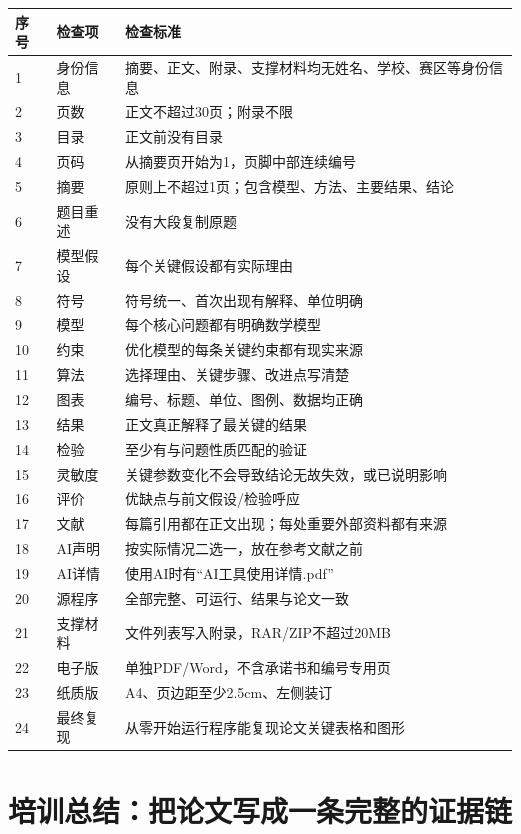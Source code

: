 \documentclass[12pt,a4paper]{article}
\begin{document}
\begin{longtable}{p{1cm}p{2cm}p{12cm}}
\toprule
序号 & 检查项 & 检查标准 \\
\midrule
1 & 身份信息 & 摘要、正文、附录、支撑材料均无姓名、学校、赛区等身份信息 \\
2 & 页数 & 正文不超过30页；附录不限 \\
3 & 目录 & 正文前没有目录 \\
4 & 页码 & 从摘要页开始为1，页脚中部连续编号 \\
5 & 摘要 & 原则上不超过1页；包含模型、方法、主要结果、结论 \\
6 & 题目重述 & 没有大段复制原题 \\
7 & 模型假设 & 每个关键假设都有实际理由 \\
8 & 符号 & 符号统一、首次出现有解释、单位明确 \\
9 & 模型 & 每个核心问题都有明确数学模型 \\
10 & 约束 & 优化模型的每条关键约束都有现实来源 \\
11 & 算法 & 选择理由、关键步骤、改进点写清楚 \\
12 & 图表 & 编号、标题、单位、图例、数据均正确 \\
13 & 结果 & 正文真正解释了最关键的结果 \\
14 & 检验 & 至少有与问题性质匹配的验证 \\
15 & 灵敏度 & 关键参数变化不会导致结论无故失效，或已说明影响 \\
16 & 评价 & 优缺点与前文假设/检验呼应 \\
17 & 文献 & 每篇引用都在正文出现；每处重要外部资料都有来源 \\
18 & AI声明 & 按实际情况二选一，放在参考文献之前 \\
19 & AI详情 & 使用AI时有“AI工具使用详情.pdf” \\
20 & 源程序 & 全部完整、可运行、结果与论文一致 \\
21 & 支撑材料 & 文件列表写入附录，RAR/ZIP不超过20MB \\
22 & 电子版 & 单独PDF/Word，不含承诺书和编号专用页 \\
23 & 纸质版 & A4、页边距至少2.5cm、左侧装订 \\
24 & 最终复现 & 从零开始运行程序能复现论文关键表格和图形 \\
\bottomrule
\end{longtable}

\section{培训总结：把论文写成一条完整的证据链}
\end{document}
